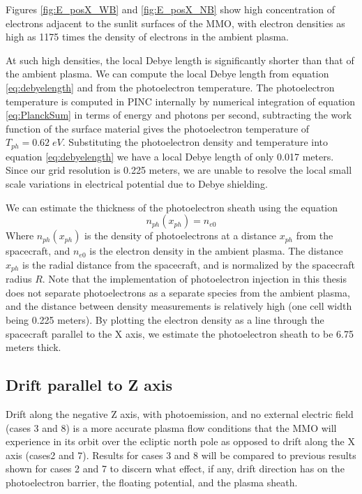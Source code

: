 Figures \ref{fig:E_posX_WB} and \ref{fig:E_posX_NB} show high concentration of electrons adjacent to the sunlit surfaces of the MMO, with electron densities as high as 1175 times the density of electrons in the ambient plasma. 

At such high densities, the local Debye length is significantly shorter than that of the ambient plasma. We can compute the local Debye length from equation \eqref{eq:debyelength} and from the photoelectron temperature. The photoelectron temperature is computed in PINC internally by numerical integration of equation \eqref{eq:PlanckSum} in terms of energy and photons per second, subtracting the work function of the surface material gives the photoelectron temperature of $T_{ph} = 0.62 \; eV$. Substituting the photoelectron density and temperature into equation \eqref{eq:debyelength} we have a local Debye length of only 0.017 meters. Since our grid resolution is 0.225 meters, we are unable to resolve the local small scale variations in electrical potential due to Debye shielding.

We can estimate the thickness of the photoelectron sheath using the equation \parencite{Zhao1996}
\begin{equation}\label{eq:PhSheathThickness}
    n_{ph}(x_{ph}) = n_{e0}
\end{equation}
Where $n_{ph}(x_{ph})$ is the density of photoelectrons at a distance $x_{ph}$ from the spacecraft, and $n_{e0}$ is the electron density in the ambient plasma. The distance $x_{ph}$ is the radial distance from the spacecraft, and is normalized by the spacecraft radius $R$. Note that the implementation of photoelectron injection in this thesis does not separate photoelectrons as a separate species from the ambient plasma, and the distance between density measurements is relatively high (one cell width being 0.225 meters). By plotting the electron density as a line through the spacecraft parallel to the X axis, we estimate the photoelectron sheath to be 6.75 meters thick.


\subsection*{Drift parallel to Z axis}
Drift along the negative Z axis, with photoemission, and no external electric field (cases 3 and 8) is a more accurate plasma flow conditions that the MMO will experience in its orbit over the ecliptic north pole as opposed to drift along the X axis (cases2 and 7). Results for cases 3 and 8 will be compared to previous results shown for cases  2 and 7 to discern what effect, if any, drift direction has on the photoelectron barrier, the floating potential, and the plasma sheath. 

